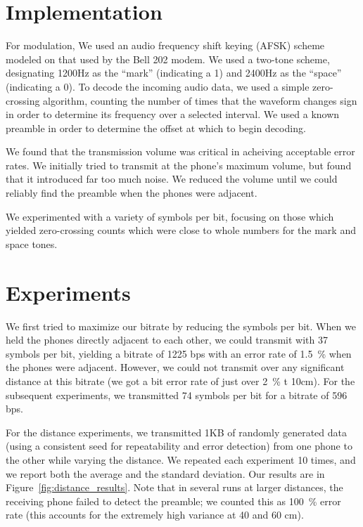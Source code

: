\documentclass{article}
\title{\class} \author{\us}
\begin{document}
\maketitle

\section{Implementation}
For modulation, We used an audio frequency shift keying (AFSK) scheme
modeled on that used by the Bell 202 modem. We used a two-tone scheme,
designating 1200Hz as the ``mark'' (indicating a 1) and 2400Hz as the
``space'' (indicating a 0). To decode the incoming audio data, we used
a simple zero-crossing algorithm, counting the number of times that
the waveform changes sign in order to determine its frequency over a
selected interval. We used a known preamble in order to determine the
offset at which to begin decoding.

We found that the transmission volume was critical in acheiving
acceptable error rates. We initially tried to transmit at the phone's
maximum volume, but found that it introduced far too much noise. We
reduced the volume until we could reliably find the preamble when the
phones were adjacent.

We experimented with a variety of symbols per bit, focusing on those
which yielded zero-crossing counts which were close to whole numbers
for the mark and space tones.

\section{Experiments}
We first tried to maximize our bitrate by reducing the symbols per
bit. When we held the phones directly adjacent to each other, we could
transmit with 37 symbols per bit, yielding a bitrate of 1225 bps with
an error rate of 1.5~\% when the phones were adjacent. However, we
could not transmit over any significant distance at this bitrate (we
got a bit error rate of just over 2~\% t 10cm). For the subsequent
experiments, we transmitted 74 symbols per bit for a bitrate of 596
bps.

For the distance experiments, we transmitted 1KB of randomly generated
data (using a consistent seed for repeatability and error detection)
from one phone to the other while varying the distance. We repeated
each experiment 10 times, and we report both the average and the
standard deviation. Our results are in
Figure~\ref{fig:distance_results}. Note that in several runs at larger
distances, the receiving phone failed to detect the preamble; we
counted this as 100~\% error rate (this accounts for the extremely
high variance at 40 and 60 cm).
\end{document}
